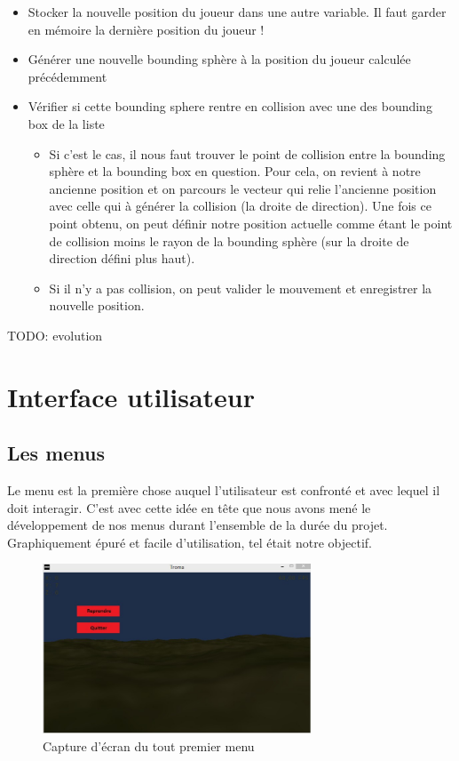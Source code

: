 \documentclass[11pt]{report}
\begin{document}
\begin{itemize}
\item Stocker la nouvelle position du joueur dans une autre variable. Il faut garder en mémoire la dernière position du joueur !
\item Générer une nouvelle bounding sphère à la position du joueur calculée précédemment
\item Vérifier si cette bounding sphere rentre en collision avec une des bounding box de la liste
\begin{itemize}
\item Si c'est le cas, il nous faut trouver le point de collision entre la bounding sphère et la bounding box en question. Pour cela, on revient à notre ancienne position et on parcours le vecteur qui relie l'ancienne position avec celle qui à générer la collision (la droite de direction). Une fois ce point obtenu, on peut définir notre position actuelle comme étant le point de collision moins le rayon de la bounding sphère (sur la droite de direction défini plus haut).
\item Si il n'y a pas collision, on peut valider le mouvement et enregistrer la nouvelle position.
\end{itemize}
\end{itemize}

TODO: evolution

\chapter{Interface utilisateur}

\section{Les menus}

Le menu est la première chose auquel l'utilisateur est confronté et avec lequel il doit interagir. C'est avec cette idée en tête que nous avons mené le développement de nos menus durant l'ensemble de la durée du projet. Graphiquement épuré et facile d'utilisation, tel était notre objectif.

\begin{figure}[htbp]
\centering
\includegraphics[width=8cm]{menu-pause-0.jpg}
\caption{Capture d'écran du tout premier menu}
\end{figure}
\end{document}
